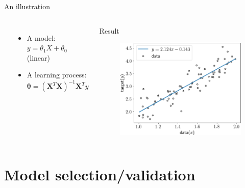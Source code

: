 \documentclass[handout]{beamer}
\begin{document}
\begin{frame}{An illustration}
\begin{columns}
\begin{itemize}
\end{itemize}
\begin{itemize}
\pause
    \item A \alert{model}: $y = \theta_1 X + \theta_0$ (linear)
\pause
    \item A \alert{learning} process:
    $\mathbf{\theta}=(\mathbf{X}^T\mathbf{X})^{-1}\mathbf{X}^Ty$
\end{itemize}
\pause
\begin{block}{Result}
    \begin{figure}
    \includegraphics[width=.9\textwidth]{fig/L1/interp-lin.png}
    \end{figure}
\end{block}
\end{columns}
\end{frame}

\section{Model selection/validation}
\end{document}
